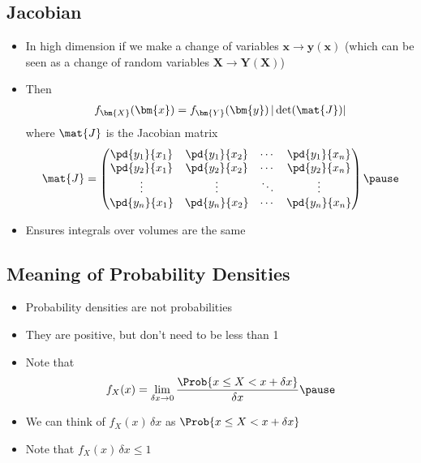 \begin{slide}
\section[-1]{Jacobian}

\begin{PauseHighLight}
  \begin{itemize}
  \item In high dimension if we make a change of variables
    $\bm{x} \rightarrow \bm{y}(\bm{x})$ (which can be seen as a change
    of random variables $\bm{X}\rightarrow\bm{Y}(\bm{X})$)\pause
  \item Then
    \begin{align*}
      f_{\bm{X}}(\bm{x}) = f_{\bm{Y}}(\bm{y}) \, |\det(\mat{J})| 
    \end{align*}
    where $\mat{J}$ is the Jacobian matrix
    \begin{align*}
      \mat{J} =
      \begin{pmatrix}
        \pd{y_1}{x_1} & \pd{y_1}{x_2} & \cdots & \pd{y_1}{x_n} \\
        \pd{y_2}{x_1} & \pd{y_2}{x_2} & \cdots & \pd{y_2}{x_n} \\
        \vdots & \vdots & \ddots & \vdots \\
        \pd{y_n}{x_1} & \pd{y_n}{x_2} & \cdots & \pd{y_n}{x_n}
      \end{pmatrix}\pause
    \end{align*}
  \item Ensures integrals over volumes are the same\pause
  \end{itemize}
\end{PauseHighLight}

\end{slide}


\begin{slide}
\section{Meaning of Probability Densities}

\begin{PauseHighLight}
  \begin{itemize}
  \item Probability densities are not probabilities\pause
  \item They are positive, but don't need to be less than 1\pause
  \item Note that
    \begin{align*}
      f_X(x) = \lim_{\delta x\rightarrow 0}
      \frac{\Prob{x \leq X < x + \delta x}}{\delta x}\pause
    \end{align*}
  \item We can think of $f_X(x)\,\delta x$ as $\Prob{x \leq X < x +
      \delta x}$\pause
  \item Note that $f_X(x)\,\delta x\leq 1$\pause
  \end{itemize}
\end{PauseHighLight}

\end{slide}



